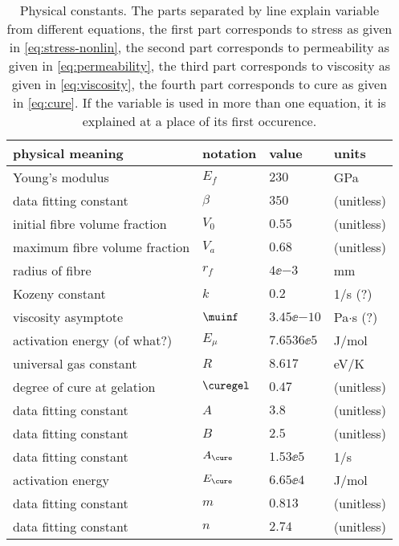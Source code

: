 \documentclass[twoside,a4paper,12pt]{article}
\newcommand{\note}[1]{{\color{red}(#1)}}
\newcommand{\QM}{{\color{red}(?)}}
\begin{document}
\begin{table}
  \centering
  \begin{tabular}{llll}
    \toprule
    physical meaning & notation & value & units \\
    \midrule
    Young's modulus               & $E_f$        & $230$         & GPa            \\ 
    data fitting constant         & $\beta$      & $350$         & (unitless)            \\
    initial fibre volume fraction & $V_0$        & $0.55$        & (unitless)     \\
    maximum fibre volume fraction & $V_a$        & $0.68$        & (unitless)     \\
    \midrule
    radius of fibre               & $r_f$        & $4\ee{-3}$    & mm             \\
    Kozeny constant              & $k$          & $0.2$         & 1/s \QM            \\
    \midrule
    viscosity asymptote     & $\muinf$ & $3.45\ee{-10}$ & Pa$\cdot$s \QM \\ 
    activation energy \note{of what?}    & $E_\mu$ & $7.6536\ee{5}$& J/mol\\
    universal gas constant        & $R$          & $8.617$       & eV/K           \\
    degree of cure at  gelation   & $\curegel$   & $0.47$        & (unitless)            \\ 
    data fitting constant        &$A$ & $3.8$&(unitless)\\
    data fitting constant        &$B$ & $2.5$&(unitless)\\
    \midrule
     data fitting constant             &$A_\cure$&$1.53\ee{5}$& 1/s \\
     activation energy             &$E_\cure$& $6.65\ee{4}$  & J/mol          \\
     data fitting constant             &$m$&$0.813$& (unitless) \\
     data fitting constant             &$n$&$2.74$& (unitless) \\
    \bottomrule
  \end{tabular}
  \caption{Physical constants. The parts separated by line explain variable from different equations, the first part corresponds to stress as given in \eqref{eq:stress-nonlin}, the second part corresponds to permeability as given in \eqref{eq:permeability}, the third part corresponds to viscosity as given in \eqref{eq:viscosity}, the fourth part corresponds to cure as given in \eqref{eq:cure}. If the variable is used in more than one equation, it is explained at a place of its first occurence.}
  \label{tab:phys-const}
\end{table}
\end{document}
